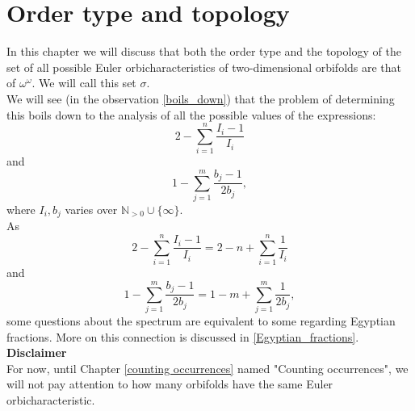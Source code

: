 \chapter{Order type and topology}\label{order structure}
%
%
%
In this chapter we will discuss that both the order type and the topology 
of the set of all possible Euler orbicharacteristics 
of two-dimensional orbifolds are that of $\omega^\omega$. We will call this set $\sigma$. \\ 
We will see (in the observation \ref{boils_down}) that the problem of determining this boils
 down to the 
 analysis of all 
the possible 
values of the expressions:
\begin{equation}
2 - \sum_{i=1}^n \frac{I_i-1}{I_i}
\end{equation}
and 
\begin{equation}
1 - \sum_{j=1}^m \frac{b_j-1}{2b_j},
\end{equation}
where $I_i, b_j$ varies over $\mathbb{N}_{>0} \cup \{\infty\}$. \\
As
\begin{equation}
2 - \sum_{i=1}^n \frac{I_i-1}{I_i} = 2 - n + \sum_{i=1}^n \frac{1}{I_i}
\end{equation}
and 
\begin{equation}
1 - \sum_{j=1}^m \frac{b_j-1}{2b_j} = 1 - m + \sum_{j=1}^m \frac{1}{2b_j},
\end{equation}
some questions about the spectrum are equivalent to some regarding Egyptian fractions. 
More on this connection is discussed in \ref{Egyptian_fractions}.
\\[16pt]
\textbf{Disclaimer}\\
For now, until Chapter \ref{counting occurrences} named "Counting occurrences", 
we will not pay attention 
to how many orbifolds have the same Euler orbicharacteristic. 


